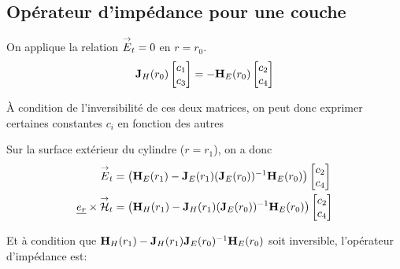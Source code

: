 \subsection{Opérateur d'impédance pour une couche}

\newcommand{\mr}{r}
\newcommand{\mt}{\theta}
\newcommand{\mz}{z}

\begin{figure}[!hbt]
    \centering
    \begin{tikzpicture}
        
    \end{tikzpicture}
\end{figure}


On applique la relation $\vE_t = 0$ en $r = r_0$.
\begin{equation}
    \mJ_{H}(r_0)
    \begin{bmatrix}
        c_1 \\
        c_3
    \end{bmatrix}
    =-\mH_{E}(r_0)
    \begin{bmatrix}
        c_2 \\
        c_4
    \end{bmatrix}
\end{equation}

À condition de l'inversibilité de ces deux matrices, on peut donc exprimer certaines constantes $c_i$ en fonction des autres

Sur la surface extérieur du cylindre ($r=r_1$), on a donc 
\begin{align}
    \vE_t &= 
    \left(\mH_{E}(r_1) - \mJ_{E}(r_1)(\mJ_{E}(r_0))^{-1}\mH_{E}(r_0)\right)
    \begin{bmatrix}
        c_2 \\
        c_4
    \end{bmatrix}
    \\
    \v{e_r}\times\vH_t &= 
    \left(\mH_{H}(r_1) - \mJ_{H}(r_1)(\mJ_{E}(r_0))^{-1}\mH_{E}(r_0) \right)
    \begin{bmatrix}
        c_2 \\
        c_4
    \end{bmatrix}
\end{align}

Et à condition que $\mH_{H}(r_1) - \mJ_{H}(r_1)\mJ_{E}(r_0)^{-1}\mH_{E}(r_0)$ soit inversible, l'opérateur d'impédance est:


